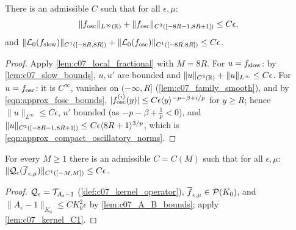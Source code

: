 \begin{lemma}
  \label{lem:c07_compact_linear}
  There is an admissible $C$ such that for all $\epsilon,\mu$:
  \begin{equation}\label{eqn:approx_compact_oscillatory_norms}
    \|f_{\textup{osc}}\|_{L^\infty(\mathbb{R})}+\|f_{\textup{osc}}\|_{C^3([-8R-1,8R+1])}\le C\epsilon,
  \end{equation}
  and $\|\mathcal{L}_0(f_{\textup{slow}})\|_{C^1([-8R,8R])}+\|\mathcal{L}_0(f_{\textup{osc}})\|_{C^1([-8R,8R])}\le C\epsilon$.
\end{lemma}
\begin{proof}
  Apply \cref{lem:c07_local_fractional} with $M=8R$. For $u=f_{\textup{slow}}$: by \cref{lem:c07_slow_bounds},
  $u,u'$ are bounded and $\|u\|_{C^3(\mathbb{R})}+\|u\|_{L^\infty}\le C\epsilon$. For $u=f_{\textup{osc}}$: it is
  $C^\infty$, vanishes on $(-\infty,R]$ (\cref{lem:c07_family_smooth}), and by
  \eqref{eqn:approx_fosc_bounds}, $|f_{\textup{osc}}^{(i)}(y)|\le C\epsilon\langle y \rangle^{-p-\beta+i/p}$ for $y\ge R$; hence
  $\|u\|_{L^\infty}\le C\epsilon$, $u'$ bounded (as $-p-\beta+\frac1p<0$), and
  $\|u\|_{C^3([-8R-1,8R+1])}\le C\epsilon\langle 8R+1 \rangle^{3/p}$, which is \eqref{eqn:approx_compact_oscillatory_norms}.
\end{proof}

\begin{lemma}
  \label{lem:c07_compact_Q}
  For every $M\ge1$ there is an admissible $C=C(M)$ such that for all $\epsilon,\mu$:
  $\|\mathcal{Q}_\epsilon(\overline{f}_{\epsilon,\mu})\|_{C^1([-M,M])}\le C\epsilon$.
\end{lemma}
\begin{proof}
  $\mathcal{Q}_\epsilon=\mathcal{T}_{A_\epsilon-1}$ (\cref{def:c07_kernel_operator}), $\overline{f}_{\epsilon,\mu}\in\mathcal{P}(K_0)$, and
  $\|A_\epsilon-1\|_{K_0}\le CK_0^2\epsilon$ by \cref{lem:c07_A_B_bounds}; apply \cref{lem:c07_kernel_C1}.
\end{proof}

